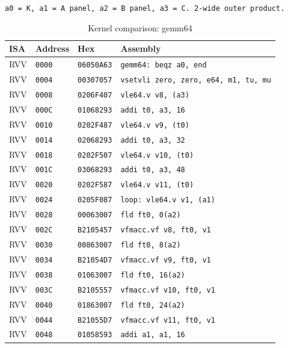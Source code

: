 \begin{table}[htbp]
\centering
\caption{Kernel comparison: gemm64}
\begingroup
\scriptsize
\setlength{\tabcolsep}{4pt}
\noindent \texttt{a0 = K, a1 = A panel, a2 = B panel, a3 = C. 2-wide outer product.}\par
\vspace{0.6ex}
\begin{tabular}{@{}l|l|l|p{7.2cm}@{}}
\toprule
ISA & Address & Hex & Assembly \\
\midrule
RVV & \texttt{0000} & \texttt{06050A63} & \texttt{gemm64: beqz a0, end} \\
RVV & \texttt{0004} & \texttt{00307057} & \texttt{vsetvli zero, zero, e64, m1, tu, mu} \\
RVV & \texttt{0008} & \texttt{0206F407} & \texttt{vle64.v v8, (a3)} \\
RVV & \texttt{000C} & \texttt{01068293} & \texttt{addi t0, a3, 16} \\
RVV & \texttt{0010} & \texttt{0202F487} & \texttt{vle64.v v9, (t0)} \\
RVV & \texttt{0014} & \texttt{02068293} & \texttt{addi t0, a3, 32} \\
RVV & \texttt{0018} & \texttt{0202F507} & \texttt{vle64.v v10, (t0)} \\
RVV & \texttt{001C} & \texttt{03068293} & \texttt{addi t0, a3, 48} \\
RVV & \texttt{0020} & \texttt{0202F587} & \texttt{vle64.v v11, (t0)} \\
RVV & \texttt{0024} & \texttt{0205F087} & \texttt{loop: vle64.v v1, (a1)} \\
RVV & \texttt{0028} & \texttt{00063007} & \texttt{fld ft0, 0(a2)} \\
RVV & \texttt{002C} & \texttt{B2105457} & \texttt{vfmacc.vf v8, ft0, v1} \\
RVV & \texttt{0030} & \texttt{00863007} & \texttt{fld ft0, 8(a2)} \\
RVV & \texttt{0034} & \texttt{B21054D7} & \texttt{vfmacc.vf v9, ft0, v1} \\
RVV & \texttt{0038} & \texttt{01063007} & \texttt{fld ft0, 16(a2)} \\
RVV & \texttt{003C} & \texttt{B2105557} & \texttt{vfmacc.vf v10, ft0, v1} \\
RVV & \texttt{0040} & \texttt{01863007} & \texttt{fld ft0, 24(a2)} \\
RVV & \texttt{0044} & \texttt{B21055D7} & \texttt{vfmacc.vf v11, ft0, v1} \\
RVV & \texttt{0048} & \texttt{01058593} & \texttt{addi a1, a1, 16} \\

\end{tabular}
\end{table}
